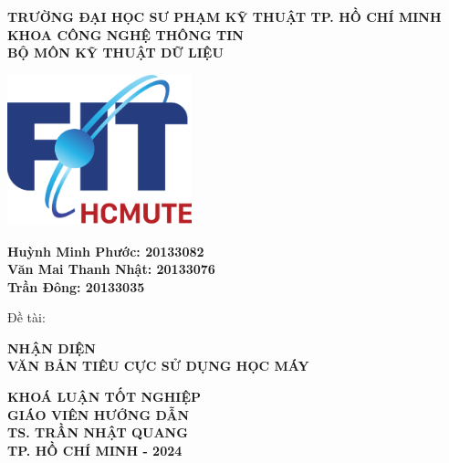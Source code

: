 \thispagestyle{empty}
\begin{center}
    \fontsize{14pt}{21pt}
    \textbf{TRƯỜNG ĐẠI HỌC SƯ PHẠM KỸ THUẬT TP. HỒ CHÍ MINH}\\
    \textbf{KHOA CÔNG NGHỆ THÔNG TIN}\\
    \textbf{BỘ MÔN KỸ THUẬT DỮ LIỆU}\\
\end{center}

\vspace{0.5cm}
\begin{center}
    \includegraphics[width=0.4\textwidth]{prelims/image/logo-cntt2021.png}
\end{center}
\vspace{0.5cm}

\begin{center}
    \fontsize{14pt}{21pt}
    \textbf{Huỳnh Minh Phước: 20133082}\\
    \textbf{Văn Mai Thanh Nhật: 20133076}\\
    \textbf{Trần Đông: 20133035}\\
    \begin{minipage}{0.8\textwidth}
        \fontsize{14pt}{21pt}
        Đề tài:
    \end{minipage}
\end{center}
\begin{center}
    \fontsize{20pt}{30pt}
    \textbf{NHẬN DIỆN\\VĂN BẢN TIÊU CỰC SỬ DỤNG HỌC MÁY}\\
\end{center}
\vspace{0.3cm}
\begin{center}
    \fontsize{14pt}{21pt}
    \textbf{KHOÁ LUẬN TỐT NGHIỆP}\\
    \vspace{1CM}
    \textbf{GIÁO VIÊN HƯỚNG DẪN}\\
    \textbf{TS. TRẦN NHẬT QUANG}\\
    \vfill
    \textbf{TP. HỒ CHÍ MINH - 2024}
\end{center}
\restoregeometry

